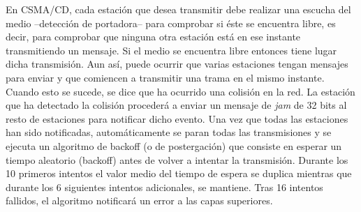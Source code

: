 \documentclass[a4paper]{article}
\begin{document}
	En CSMA/CD, cada estación que desea transmitir debe realizar una escucha del medio –detección de portadora– para comprobar si éste se encuentra libre, es decir, para comprobar que ninguna otra estación está en ese instante transmitiendo un mensaje. Si el medio se encuentra libre entonces tiene lugar dicha transmisión. Aun así, puede ocurrir que varias estaciones tengan mensajes para enviar y que comiencen a transmitir una trama en el mismo instante. Cuando esto se sucede, se dice que ha ocurrido una colisión en la red. La estación que ha detectado la colisión procederá a enviar un mensaje de \textit{jam} de 32 bits al resto de estaciones para notificar dicho evento. Una vez que todas las estaciones han sido notificadas, automáticamente se paran todas las transmisiones y se ejecuta un algoritmo de backoff (o de postergación) que consiste en esperar un tiempo aleatorio (backoff) antes de volver a intentar la transmisión. Durante los 10 primeros intentos el valor medio del tiempo de espera se duplica mientras que durante los 6 siguientes intentos adicionales, se mantiene. Tras 16 intentos fallidos, el algoritmo notificará un error a las capas superiores.
	
	
	\begin{center}
		\vfill
		\noindent{}
	\end{center}
	
\end{document}
